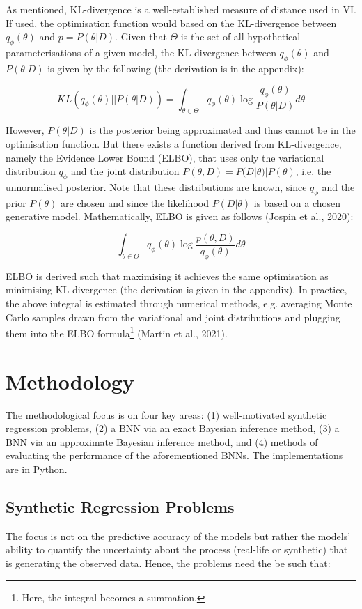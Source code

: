 \documentclass[conference]{IEEEtran}
\begin{document}
As mentioned, KL-divergence is a well-established measure of distance used in VI. If used, the optimisation function would based on the KL-divergence between $q_\phi(\theta)$ and $p = P(\theta|D)$. Given that $\Theta$ is the set of all hypothetical parameterisations of a given model, the KL-divergence between $q_\phi(\theta)$ and $P(\theta|D)$ is given by the following (the derivation is in the appendix):

\begin{equation*}
	KL(q_\phi(\theta) || P(\theta|D))
	= \int_{\theta \in \Theta} q_\phi(\theta) \log \frac{q_\phi(\theta)}{P(\theta|D)} d\theta
\end{equation*}

However, $P(\theta|D)$ is the posterior being approximated and thus cannot be in the optimisation function. But there exists a function derived from KL-divergence, namely the Evidence Lower Bound (ELBO), that uses only the variational distribution $q_\phi$ and the joint distribution $P(\theta, D) = P(D|\theta)|P(\theta)$, i.e. the unnormalised posterior. Note that these distributions are known, since $q_\phi$ and the prior $P(\theta)$ are chosen and since the likelihood $P(D|\theta)$ is based on a chosen generative model. Mathematically, ELBO is given as follows (Jospin et al., 2020):

\begin{equation*}
	\int_{\theta \in \Theta} q_\phi(\theta) \log \frac{p(\theta, D)}{q_\phi(\theta)} d\theta
\end{equation*}

ELBO is derived such that maximising it achieves the same optimisation as minimising KL-divergence (the derivation is given in the appendix). In practice, the above integral is estimated through numerical methods, e.g. averaging Monte Carlo samples drawn from the variational and joint distributions and plugging them into the ELBO formula\footnote{Here, the integral becomes a summation.} (Martin et al., 2021).

\section{Methodology}
The methodological focus is on four key areas: (1) well-motivated synthetic regression problems, (2) a BNN via an exact Bayesian inference method, (3) a BNN via an approximate Bayesian inference method, and (4) methods of evaluating the performance of the aforementioned BNNs. The implementations are in Python.

\subsection{Synthetic Regression Problems}
The focus is not on the predictive accuracy of the models but rather the models' ability to quantify the uncertainty about the process (real-life or synthetic) that is generating the observed data. Hence, the problems need the be such that:\\
\end{document}

